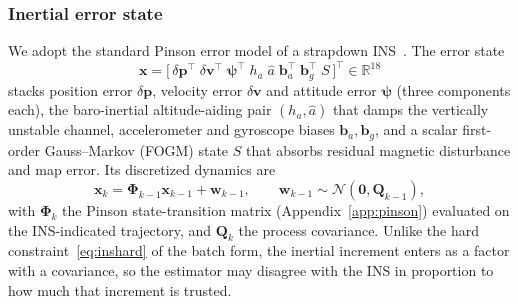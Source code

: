 \subsubsection{Inertial error state}
We adopt the standard Pinson error model of a strapdown
INS~\cite{groves2013,titterton2004,farrell2008}. The error state
\begin{equation}
\mathbf{x}=\big[\,\delta\mathbf{p}^{\top}\;\delta\mathbf{v}^{\top}\;
\boldsymbol{\psi}^{\top}\;h_a\;\hat{a}\;\mathbf{b}_a^{\top}\;\mathbf{b}_g^{\top}\;S\,\big]^{\top}
\in\mathbb{R}^{18}
\label{eq:state}
\end{equation}
stacks position error $\delta\mathbf{p}$, velocity error $\delta\mathbf{v}$ and
attitude error $\boldsymbol{\psi}$ (three components each), the baro-inertial
altitude-aiding pair $(h_a,\hat{a})$ that damps the vertically unstable channel,
accelerometer and gyroscope biases $\mathbf{b}_a,\mathbf{b}_g$, and a scalar
first-order Gauss--Markov (FOGM) state $S$ that absorbs residual magnetic
disturbance and map error. Its discretized dynamics are
\begin{equation}
\mathbf{x}_{k}=\boldsymbol{\Phi}_{k-1}\mathbf{x}_{k-1}+\mathbf{w}_{k-1},
\qquad \mathbf{w}_{k-1}\sim\mathcal{N}(\mathbf{0},\mathbf{Q}_{k-1}),
\label{eq:dyn}
\end{equation}
with $\boldsymbol{\Phi}_{k}$ the Pinson state-transition matrix
(Appendix~\ref{app:pinson}) evaluated on the INS-indicated trajectory, and
$\mathbf{Q}_{k}$ the process covariance. Unlike the hard
constraint~\eqref{eq:inshard} of the batch form, the inertial increment enters
as a factor with a covariance, so the estimator may disagree with the INS in
proportion to how much that increment is trusted.

